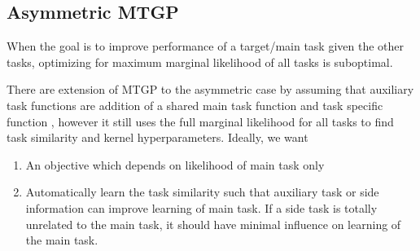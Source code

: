 \documentclass[11pt]{article}
\begin{document}
\subsection{Asymmetric MTGP}

When the goal is to improve performance of a target/main task given the other tasks, optimizing for maximum marginal likelihood of all tasks is suboptimal. 

There are extension of MTGP to the asymmetric case by assuming that auxiliary task functions are addition of a shared main task function and task specific function \cite{leenFocusedMultitaskLearning2012}, however it still uses the full marginal likelihood for all tasks to find task similarity and kernel hyperparameters. Ideally, we want
\begin{enumerate}
    \item An objective which depends on likelihood of main task only
    \item Automatically learn the task similarity such that auxiliary task or side information can improve learning of main task. If a side task is totally unrelated to the main task, it should have minimal influence on learning of the main task.
\end{enumerate}


 


\newpage
\printbibliography 
\end{document}
